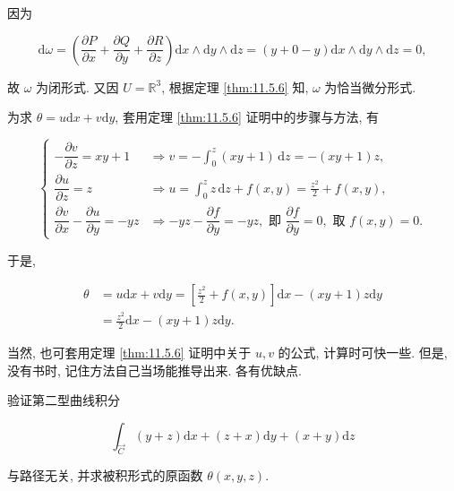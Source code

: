 \begin{solution}

因为

\[
\mathrm{d}\omega=\left(\frac{\partial P}{\partial x}+\frac{\partial Q}{\partial y}+\frac{\partial R}{\partial z}\right)\mathrm{d}x\wedge\mathrm{d}y\wedge\mathrm{d}z
=(y+0-y)\mathrm{d}x\wedge\mathrm{d}y\wedge\mathrm{d}z=0,
\]

故 $\omega$ 为闭形式. 又因 $U=\mathbb{R}^{3}$, 根据定理 \ref{thm:11.5.6} 知, $\omega$ 为恰当微分形式.

为求 $\theta=u\mathrm{d}x+v\mathrm{d}y$, 套用定理 \ref{thm:11.5.6} 证明中的步骤与方法, 有

\[
\begin{cases}
-\dfrac{\partial v}{\partial z}=xy+1&\Rightarrow v=-\displaystyle\int_{0}^{z}(xy+1)\,\mathrm{d}z=-(xy+1)z,\\[10pt]
\dfrac{\partial u}{\partial z}=z&\Rightarrow u=\displaystyle\int_{0}^{z}z\,\mathrm{d}z+f(x,y)=\frac{z^{2}}{2}+f(x,y),\\[10pt]
\dfrac{\partial v}{\partial x}-\dfrac{\partial u}{\partial y}=-yz&\Rightarrow -yz-\dfrac{\partial f}{\partial y}=-yz,\text{ 即 }\dfrac{\partial f}{\partial y}=0,\text{ 取 }f(x,y)=0.
\end{cases}
\]

于是,

\[
\begin{aligned}
\theta&=u\mathrm{d}x+v\mathrm{d}y=\left[\frac{z^{2}}{2}+f(x,y)\right]\mathrm{d}x-(xy+1)z\mathrm{d}y\\
&=\frac{z^{2}}{2}\mathrm{d}x-(xy+1)z\mathrm{d}y.
\end{aligned}
\]

当然, 也可套用定理 \ref{thm:11.5.6} 证明中关于 $u,v$ 的公式, 计算时可快一些. 但是, 没有书时, 记住方法自己当场能推导出来. 各有优缺点.

\end{solution}

\begin{example}\label{ex:11.5.3}

验证第二型曲线积分

\[
\int_{\overrightarrow{C}}(y+z)\mathrm{d}x+(z+x)\mathrm{d}y+(x+y)\mathrm{d}z
\]

与路径无关, 并求被积形式的原函数 $\theta(x,y,z)$.

\end{example}

